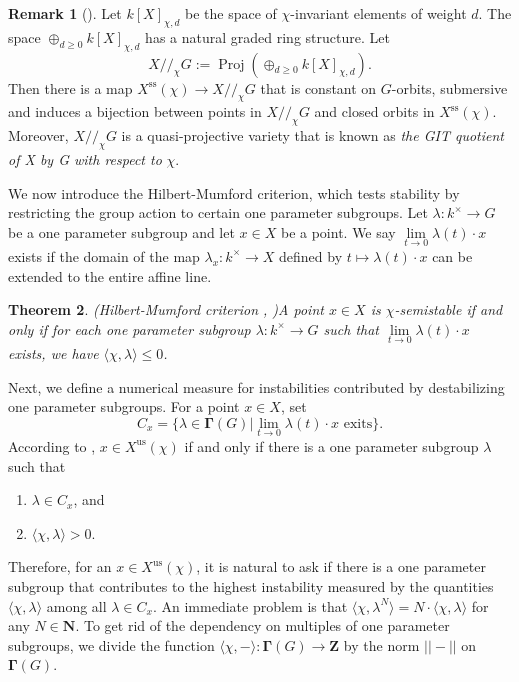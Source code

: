\documentclass[a4paper]{amsart}
\numberwithin{equation}{section}
\theoremstyle{plain}
\newtheorem{theorem}{Theorem}[section]
\theoremstyle{definition}
\newtheorem{remark}[theorem]{Remark}
\DeclareMathOperator{\Proj}{Proj}
\begin{document}
\begin{remark}[\cite{MR1304906}] Let $k[X]_{\chi,d}$ be the space of $\chi$-invariant elements of weight $d$. The space $\oplus_{d\geq 0}k[X]_{\chi,d}$ has a natural graded ring structure. Let  $$X/\!\!/_{\chi}G:=\Proj(\oplus_{d\geq 0}k[X]_{\chi,d}).$$
Then there is a map $X^{\text{ss}}(\chi)\rightarrow X/\!\!/_{\chi}G$ that is constant on $G$-orbits, submersive and induces a bijection between  points in $X/\!\!/_{\chi}G$ and closed orbits in $X^{\text{ss}}(\chi)$. Moreover, $X/\!\!/_{\chi}G$ is a quasi-projective variety that is known as \emph{the GIT quotient of X by G with respect to }$\chi$. \end{remark}

We now introduce the Hilbert-Mumford criterion, which tests stability by restricting the group action to certain one parameter subgroups. Let $\lambda:k^{\times}\rightarrow G$ be a one parameter subgroup and let $x\in X$ be a point. We say $\lim\limits_{t\rightarrow 0}\lambda(t)\cdot x$ exists if the domain of the map $\lambda_{x}:k^{\times}\rightarrow X$ defined by $t\mapsto \lambda(t)\cdot x$ can be extended to the entire affine line. 
\begin{theorem}(Hilbert-Mumford criterion \cite{MR1304906}, \cite{MR1315461})\label{HilbMumAffine}
A point $x\in X$ is $\chi$-semistable if and only if for each one 
parameter subgroup $\lambda:k^{\times}\rightarrow G$ such that $\lim\limits_{t\rightarrow 0}\lambda(t)\cdot x$ exists,
we have $\langle\chi,\lambda\rangle\leq 0$.
\end{theorem}

Next, we define a numerical measure for instabilities contributed by destabilizing one parameter subgroups. 
For a point $x\in X$, set $$C_{x}=\{\lambda\in\pmb{\Gamma}(G)|\lim_{t\rightarrow
  0}\lambda(t)\cdot x\text { exits}\}.$$
According to , $x\in X^{\text{us}}(\chi)$ if and only if there is a one parameter subgroup $\lambda$ such that 
\begin{enumerate}
    \item $\lambda\in C_{x}$, and 
    \item $\langle\chi,\lambda\rangle>0$.
\end{enumerate}

Therefore, for an $x\in X^{\text{us}}(\chi)$, it is natural to ask if there is a one parameter subgroup that contributes to the highest instability measured by the quantities $\langle\chi,\lambda\rangle$ among all $\lambda\in C_{x}$. An immediate problem is that $\langle\chi,\lambda^{N}\rangle=N\cdot\langle\chi,\lambda\rangle$ for any $N\in\mathbf{N}$. To get rid of the dependency on multiples of one parameter subgroups, we divide the function $\langle\chi,-\rangle:\pmb{\Gamma}(G)\rightarrow\mathbf{Z}$ by the norm $||-||$ on  $\pmb{\Gamma}(G)$.
\end{document}
